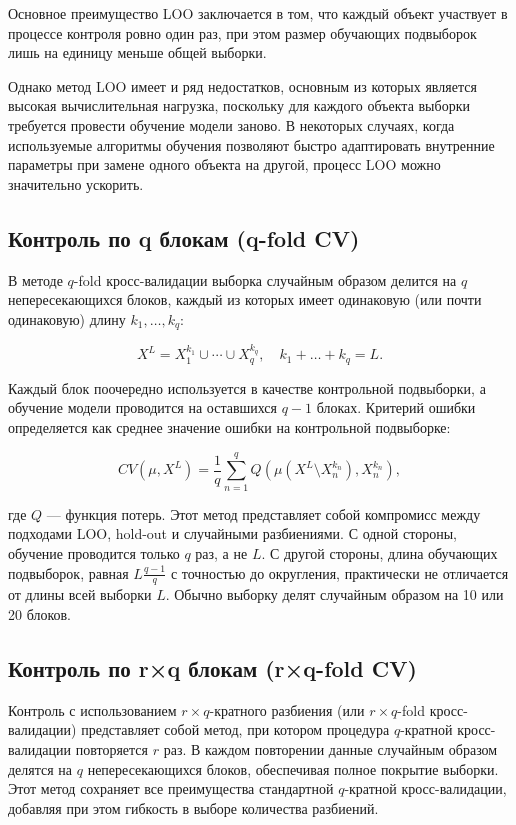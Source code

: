 Основное преимущество LOO заключается в том, что каждый объект участвует в процессе контроля ровно один раз, при этом размер обучающих подвыборок лишь на единицу меньше общей выборки.

Однако метод LOO имеет и ряд недостатков, основным из которых является высокая вычислительная нагрузка, поскольку для каждого объекта выборки требуется провести обучение модели заново. В некоторых случаях, когда используемые алгоритмы обучения позволяют быстро адаптировать внутренние параметры при замене одного объекта на другой, процесс LOO можно значительно ускорить.

\subsection{Контроль по q блокам (q-fold CV)}

В методе \( q \)-fold кросс-валидации выборка случайным образом делится на \( q \) непересекающихся блоков, каждый из которых имеет одинаковую (или почти одинаковую) длину \( k_1, \ldots, k_q \):

\[
X^L = X^{k_1}_1 \cup \cdots \cup X^{k_q}_q, \quad k_1 + \dots + k_q = L.
\]

Каждый блок поочередно используется в качестве контрольной подвыборки, а обучение модели проводится на оставшихся \( q-1 \) блоках. Критерий ошибки определяется как среднее значение ошибки на контрольной подвыборке:

\[
CV(\mu, X^L) = \frac{1}{q} \sum_{n=1}^q Q \left( \mu \left( X^L \setminus X^{k_n}_n \right), X^{k_n}_n \right),
\]

где \( Q \) — функция потерь. Этот метод представляет собой компромисс между подходами LOO, hold-out и случайными разбиениями. С одной стороны, обучение проводится только \( q \) раз, а не \( L \). С другой стороны, длина обучающих подвыборок, равная \( L \frac{q-1}{q} \) с точностью до округления, практически не отличается от длины всей выборки \( L \). Обычно выборку делят случайным образом на 10 или 20 блоков.

\subsection{Контроль по r×q блокам (r×q-fold CV)}
Контроль с использованием \(r \times q\)-кратного разбиения (или \(r \times q\)-fold кросс-валидации) представляет собой метод, при котором процедура \(q\)-кратной кросс-валидации повторяется \(r\) раз. В каждом повторении данные случайным образом делятся на \(q\) непересекающихся блоков, обеспечивая полное покрытие выборки. Этот метод сохраняет все преимущества стандартной \(q\)-кратной кросс-валидации, добавляя при этом гибкость в выборе количества разбиений.

